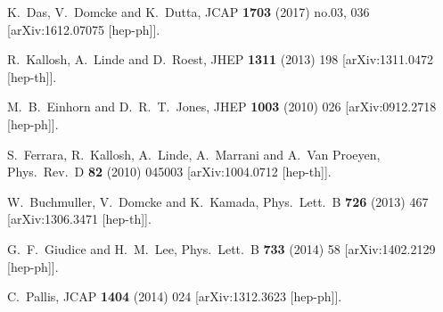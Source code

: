 \begin{thebibliography}{10}
  K.~Das, V.~Domcke and K.~Dutta,
  JCAP {\bf 1703} (2017) no.03,  036
  [arXiv:1612.07075 [hep-ph]].


  R.~Kallosh, A.~Linde and D.~Roest,
  JHEP {\bf 1311} (2013) 198
  [arXiv:1311.0472 [hep-th]].


  M.~B.~Einhorn and D.~R.~T.~Jones,
  JHEP {\bf 1003} (2010) 026
  [arXiv:0912.2718 [hep-ph]].


  S.~Ferrara, R.~Kallosh, A.~Linde, A.~Marrani and A.~Van Proeyen,
  Phys.\ Rev.\ D {\bf 82} (2010) 045003
  [arXiv:1004.0712 [hep-th]].


  W.~Buchmuller, V.~Domcke and K.~Kamada,
  Phys.\ Lett.\ B {\bf 726} (2013) 467
  [arXiv:1306.3471 [hep-th]].


  G.~F.~Giudice and H.~M.~Lee,
  Phys.\ Lett.\ B {\bf 733} (2014) 58
  [arXiv:1402.2129 [hep-ph]].


  C.~Pallis,
  JCAP {\bf 1404} (2014) 024
  [arXiv:1312.3623 [hep-ph]].



\end{thebibliography}
